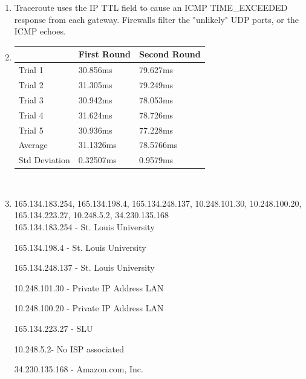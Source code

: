 \documentclass[12pt]{article}
\begin{document}
	\begin{enumerate}[nolistsep]
		\item Traceroute uses the IP TTL field to cause an ICMP TIME\_EXCEEDED response from each gateway. Firewalls filter the "unlikely" UDP ports, or the ICMP echoes.\\
		\item \begin{tabular}{|l|l|l|}
			\hline
			& First Round & Second Round \\
			\hline
			Trial 1 & 30.856ms & 79.627ms \\
			Trial 2 & 31.305ms & 79.249ms \\
			Trial 3 & 30.942ms & 78.053ms \\
			Trial 4 & 31.624ms & 78.726ms \\
			Trial 5 & 30.936ms & 77.228ms \\
			\hline
			Average & 31.1326ms & 78.5766ms \\
			Std Deviation & 0.32507ms & 0.9579ms \\
			\hline			
		\end{tabular}
		~\\
		\item 165.134.183.254, 165.134.198.4, 165.134.248.137, 10.248.101.30, 10.248.100.20, 165.134.223.27, 10.248.5.2, 34.230.135.168\\
		
		165.134.183.254 - St. Louis University
		
		165.134.198.4 - St. Louis University

		165.134.248.137 - St. Louis University
		
		10.248.101.30 - Private IP Address LAN
		
		10.248.100.20 - Private IP Address LAN
		
		165.134.223.27 - SLU
		
		10.248.5.2- No ISP associated 
		
		34.230.135.168 - Amazon.com, Inc.
	\end{enumerate}
\end{document}

